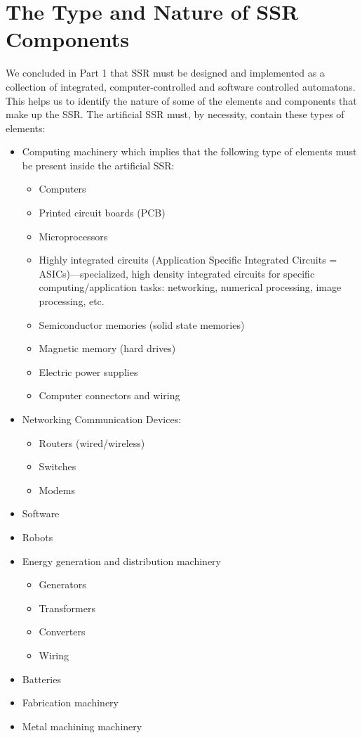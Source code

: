 \section{The Type and Nature of SSR Components}

We concluded in Part 1 that SSR must be designed and implemented as
a collection of integrated, computer-controlled and software controlled
automatons. This helps us to identify the nature of some of the
elements and components that make up the SSR. The artificial SSR must,
by necessity, contain these types of elements:

\begin{itemize}
\item Computing machinery which implies that the following type of
elements must be present inside the artificial SSR:

\begin{itemize}
\item Computers
\item Printed circuit boards (PCB)
\item Microprocessors
\item Highly integrated circuits (Application Specific Integrated
Circuits = ASICs)---specialized, high density integrated circuits for
specific computing/application tasks: networking, numerical processing,
image processing, etc.
\item Semiconductor memories (solid state memories)
\item Magnetic memory (hard drives)
\item Electric power supplies
\item Computer connectors and wiring
\end{itemize}
\item Networking Communication Devices:

\begin{itemize}
\item Routers (wired/wireless)
\item Switches
\item Modems
\end{itemize}
\item Software
\item Robots
\item Energy generation and distribution machinery

\begin{itemize}
\item Generators
\item Transformers
\item Converters
\item Wiring
\end{itemize}
\item Batteries
\item Fabrication machinery
\item Metal machining machinery
\end{itemize}

